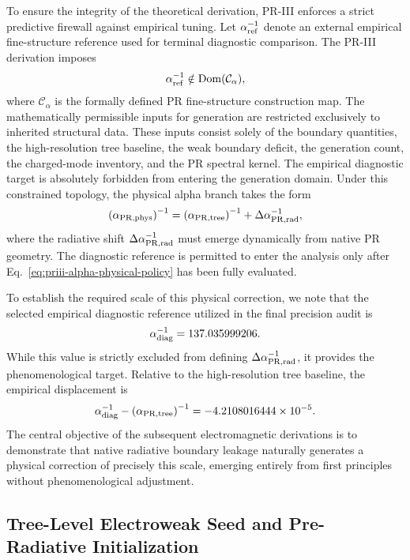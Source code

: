 \documentclass[11pt]{article}
\begin{document}
To ensure the integrity of the theoretical derivation, PR-III enforces a strict predictive firewall against empirical tuning. Let $\alpha_{\rm ref}^{-1}$ denote an external empirical fine-structure reference used for terminal diagnostic comparison. The PR-III derivation imposes
\begin{equation}
\alpha_{\rm ref}^{-1}\notin {\rm Dom}(\mathcal C_\alpha),
\end{equation}
where $\mathcal C_\alpha$ is the formally defined PR fine-structure construction map. The mathematically permissible inputs for generation are restricted exclusively to inherited structural data. These inputs consist solely of the boundary quantities, the high-resolution tree baseline, the weak boundary deficit, the generation count, the charged-mode inventory, and the PR spectral kernel. The empirical diagnostic target is absolutely forbidden from entering the generation domain. Under this constrained topology, the physical alpha branch takes the form
\begin{equation}
\left(\alpha_{\rm PR,phys}\right)^{-1}
=
\left(\alpha_{\rm PR,tree}\right)^{-1}
+\Delta\alpha_{\rm PR,rad}^{-1},
\label{eq:priii-alpha-physical-policy}
\end{equation}
where the radiative shift $\Delta\alpha_{\rm PR,rad}^{-1}$ must emerge dynamically from native PR geometry. The diagnostic reference is permitted to enter the analysis only after Eq.~\eqref{eq:priii-alpha-physical-policy} has been fully evaluated.

To establish the required scale of this physical correction, we note that the selected empirical diagnostic reference utilized in the final precision audit is
\begin{equation}
\alpha_{\rm diag}^{-1}=137.035999206.
\end{equation}
While this value is strictly excluded from defining $\Delta\alpha_{\rm PR,rad}^{-1}$, it provides the phenomenological target. Relative to the high-resolution tree baseline, the empirical displacement is
\begin{equation}
\alpha_{\rm diag}^{-1}-\left(\alpha_{\rm PR,tree}\right)^{-1}
=
-4.2108016444\times10^{-5}.
\end{equation}
The central objective of the subsequent electromagnetic derivations is to demonstrate that native radiative boundary leakage naturally generates a physical correction of precisely this scale, emerging entirely from first principles without phenomenological adjustment.

\subsection{Tree-Level Electroweak Seed and Pre-Radiative Initialization}
\label{subsec:priii-tree-electroweak-seed}
\end{document}
